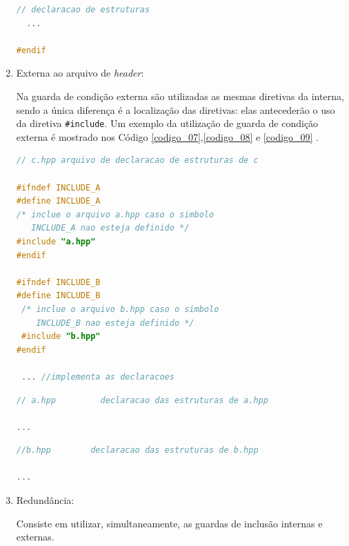 \begin{enumerate}
\begin{lstlisting}[language=C++,caption={
                        Arquivo a.hpp contendo guardas de inclusão interna},
                                                            label=codigo_06]
  // declaracao de estruturas 
  ...

#endif
\end{lstlisting}


\item Externa ao arquivo de \textit{header}:
 
Na  guarda de condição externa  são utilizadas as mesmas diretivas da interna,
 sendo a única diferença é a localização das diretivas: elas antecederão o uso
 da diretiva \texttt{\#include}. Um exemplo da utilização de guarda de condição 
externa é mostrado nos Código \ref{codigo_07},\ref{codigo_08} e
 \ref{codigo_09} \cite{ref42}.


\begin{lstlisting}[language=C++,caption={
					    Arquivo c.hpp contendo guardas de inclusão externa},
                                                            label=codigo_07]
// c.hpp arquivo de declaracao de estruturas de c

#ifndef INCLUDE_A
#define INCLUDE_A
/* inclue o arquivo a.hpp caso o simbolo 
   INCLUDE_A nao esteja definido */
#include "a.hpp"
#endif
        
#ifndef INCLUDE_B
#define INCLUDE_B
 /* inclue o arquivo b.hpp caso o simbolo 
    INCLUDE_B nao esteja definido */
 #include "b.hpp"
#endif

 ... //implementa as declaracoes

\end{lstlisting}

\begin{lstlisting}[language=C++,caption={
						   Arquivo a.hpp com guarda de inclusão externa},
                                                         label=codigo_08]
// a.hpp         declaracao das estruturas de a.hpp

...

\end{lstlisting}

\begin{lstlisting}[language=C++,caption={
					         Arquivo b.hpp com guarda de inclusão externa},
                                                           label=codigo_09]
//b.hpp        declaracao das estruturas de b.hpp

...

\end{lstlisting}


\item Redundância:\label{redundancia_melhor}

Consiste em utilizar, simultaneamente, as guardas de inclusão internas e 
externas. 


\end{enumerate}
